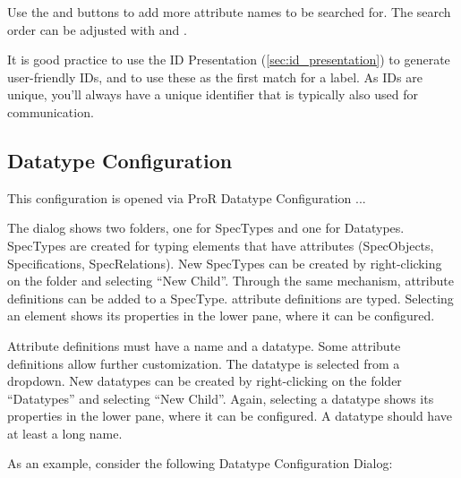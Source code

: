 {{{Use the  and  buttons to add more attribute names to be searched for.  The
search order can be adjusted with  and .

\begin{info}
It is good practice to use the ID Presentation (\ref{sec:id_presentation}) to generate
user-friendly IDs, and to use these as the first match for a label.  As IDs are unique, you'll always
have a unique identifier that is typically also used for communication.
\end{info}

\subsection{Datatype Configuration}
\label{sec:datatype_configuration}

This configuration is opened via ProR \textbar{} Datatype Configuration
...

The dialog shows two folders, one for SpecTypes and one for Datatypes.
SpecTypes are created for typing elements that have attributes
(SpecObjects, Specifications, SpecRelations).  New SpecTypes can be
created by right-clicking on the folder and selecting ``New Child''.
Through the same mechanism, attribute definitions can be added to a
SpecType.  attribute definitions are typed.  Selecting an element shows
its properties in the lower pane, where it can be configured.

Attribute definitions must have a name and a datatype.  Some attribute
definitions allow further customization.  The datatype is selected from a
dropdown.  New datatypes can be created by right-clicking on the folder
``Datatypes'' and selecting ``New Child''.  Again, selecting a datatype
shows its properties in the lower pane, where it can be configured.  A
datatype should have at least a long name.

As an example, consider the following Datatype Configuration Dialog:

}}}
